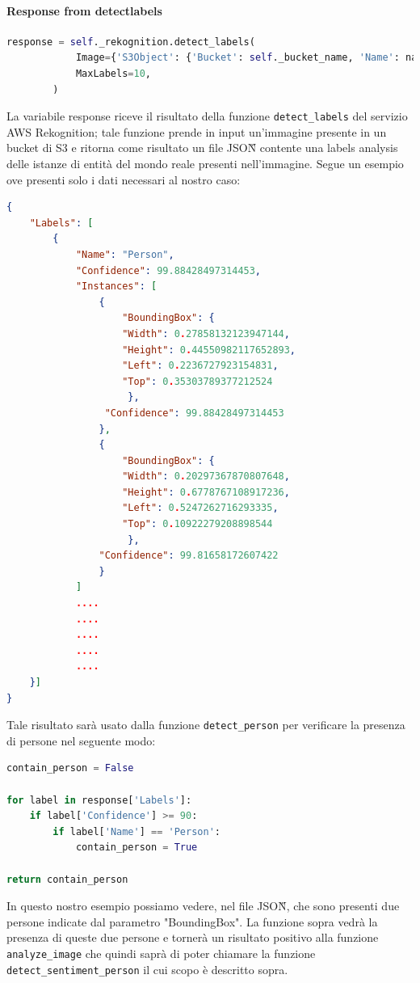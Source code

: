 \paragraph{Response from detect\textunderscore{}labels} \aCapo{}
\begin{lstlisting}[language=Python]
response = self._rekognition.detect_labels(
            Image={'S3Object': {'Bucket': self._bucket_name, 'Name': name_image}},
            MaxLabels=10,
        )
\end{lstlisting}
La variabile response riceve il risultato della funzione \verb+detect_labels+ del servizio AWS Rekognition; tale funzione prende in input un'immagine presente in un bucket di S3 e ritorna come risultato un file JSON\G{} contente una labels analysis delle istanze di entità del mondo reale presenti nell'immagine. Segue un esempio ove presenti solo i dati necessari al nostro caso:
\begin{lstlisting}[language=JSON]
{
	"Labels": [
		{
			"Name": "Person",
            "Confidence": 99.88428497314453,
            "Instances": [
            	{
                	"BoundingBox": {
                    "Width": 0.27858132123947144,
                    "Height": 0.44550982117652893,
                    "Left": 0.2236727923154831,
                    "Top": 0.35303789377212524
                     },
                 "Confidence": 99.88428497314453
                },
				{
                    "BoundingBox": {
                    "Width": 0.20297367870807648,
                    "Height": 0.6778767108917236,
                    "Left": 0.5247262716293335,
                    "Top": 0.10922279208898544
                  	 },
                "Confidence": 99.81658172607422
				}
			]
            ....
            ....
            ....
            ....
        	....
	}]
}
\end{lstlisting}
Tale risultato sarà usato dalla funzione \verb+detect_person+ per verificare la presenza di persone nel seguente modo:
\begin{lstlisting}[language=Python]
contain_person = False

for label in response['Labels']:
    if label['Confidence'] >= 90:
        if label['Name'] == 'Person':
            contain_person = True

return contain_person
\end{lstlisting}
In questo nostro esempio possiamo vedere, nel file JSON\G{}, che sono presenti due persone indicate dal parametro "BoundingBox". La funzione sopra vedrà la presenza di queste due persone e tornerà un risultato positivo alla funzione \verb+analyze_image+ che quindi saprà di poter chiamare la funzione \verb+detect_sentiment_person+ il cui scopo è descritto sopra.
